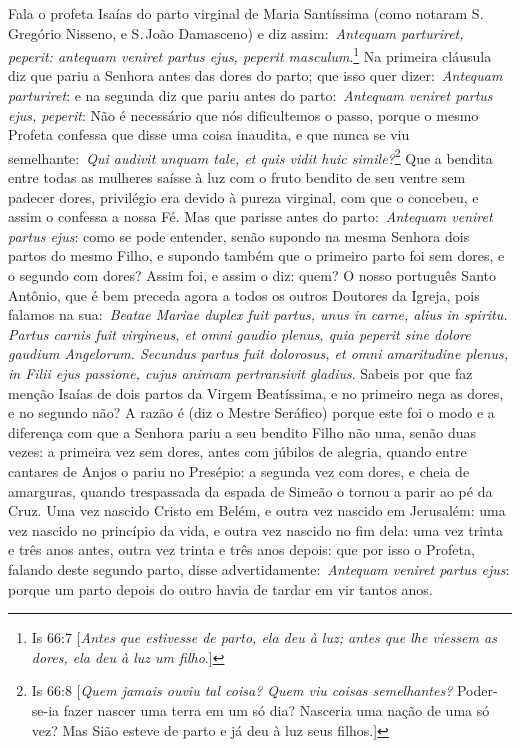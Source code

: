 Fala o profeta Isaías do parto virginal de Maria Santíssima
(como notaram S.\,Gregório Nisseno, e S.\,João Damasceno) e diz
assim:~\emph{Antequam parturiret, peperit: antequam veniret partus ejus,
peperit masculum}.\footnote{Is 66:7 [\textit{Antes que estivesse de parto, ela deu à luz; antes que lhe viessem as dores, ela deu à luz um filho}.]} Na primeira cláusula diz que pariu a
Senhora antes das dores do parto; que isso quer dizer:~\emph{Antequam
parturiret}: e na segunda diz que pariu antes do parto:~\emph{Antequam
veniret partus ejus, peperit}: Não é necessário que nós dificultemos o
passo, porque o mesmo Profeta confessa que disse uma coisa inaudita, e
que nunca se viu semelhante:~\emph{Qui audivit unquam tale, et quis
vidit huic simile?}\footnote{Is 66:8 [\textit{Quem jamais ouviu tal coisa? Quem viu coisas semelhantes?} Poder-se-ia fazer nascer uma terra em um só dia? Nasceria uma nação de uma só vez? Mas Sião esteve de parto e já deu à luz seus filhos.]} Que a bendita entre todas as
mulheres saísse à luz com o fruto bendito de seu ventre sem padecer
dores, privilégio era devido à pureza virginal, com que o concebeu, e
assim o confessa a nossa Fé. Mas que parisse antes do
parto:~\emph{Antequam veniret partus ejus}: como se pode entender, senão
supondo na mesma Senhora dois partos do mesmo Filho, e supondo também
que o primeiro parto foi sem dores, e o segundo com dores? Assim foi, e
assim o diz: quem? O nosso português Santo Antônio, que é bem preceda
agora a todos os outros Doutores da Igreja, pois falamos na
sua:~\emph{Beatae Mariae duplex fuit partus, unus in carne, alius in
spiritu. Partus carnis fuit virgineus, et omni gaudio plenus, quia
peperit sine dolore gaudium Angelorum. Secundus partus fuit dolorosus,
et omni amaritudine plenus, in Filii ejus passione, cujus animam
pertransivit gladius}. Sabeis por que faz menção Isaías de dois partos
da Virgem Beatíssima, e no primeiro nega as dores, e no segundo não? A
razão é (diz o Mestre Seráfico) porque este foi o modo e a diferença com
que a Senhora pariu a seu bendito Filho não uma, senão duas vezes: a
primeira vez sem dores, antes com júbilos de alegria, quando entre
cantares de Anjos o pariu no Presépio: a segunda vez com dores, e cheia
de amarguras, quando trespassada da espada de Simeão o tornou a parir ao
pé da Cruz. Uma vez nascido Cristo em Belém, e outra vez nascido em
Jerusalém: uma vez nascido no princípio da vida, e outra vez nascido no
fim dela: uma vez trinta e três anos antes, outra vez trinta e três anos
depois: que por isso o Profeta, falando deste segundo parto, disse
advertidamente:~\emph{Antequam veniret partus ejus}: porque um parto
depois do outro havia de tardar em vir tantos anos.


